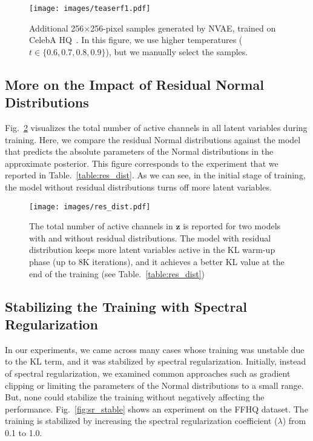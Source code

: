 \documentclass{article}
\newcommand{\z}{{\pmb{z}}}
\begin{document}
\begin{figure}
\centering
\hspace{-0.9cm}
\texttt{[image: images/teaserf1.pdf]}
\caption{Additional 256$\times$256-pixel samples generated by NVAE, trained on CelebA HQ~\cite{karras2018progressive}. In this figure, we use higher temperatures ($t \in \{0.6, 0.7, 0.8, 0.9\}$), but we manually select the samples.}
\label{fig:more_res2}
\vspace{-0.3cm}
\end{figure} 
\subsection{More on the Impact of Residual Normal Distributions}\label{app:res_dist}
Fig.~\ref{fig:res_dist} visualizes the total number of active channels in all latent variables during training. Here, we compare the residual Normal distributions against the model that predicts the absolute parameters of the Normal distributions in the approximate posterior. This figure corresponds to the experiment that we reported in Table.~\ref{table:res_dist}. As we can see, in the initial stage of training, the model without residual distributions turns off more latent variables. 

\begin{figure}
\centering
\texttt{[image: images/res\_dist.pdf]}
\caption{The total number of active channels in $\z$ is reported for two models with and without residual distributions. The model with residual distribution keeps more latent variables active in the KL warm-up phase (up to 8K iterations), and it achieves a better KL value at the end of the training (see Table.~\ref{table:res_dist})}
\label{fig:res_dist}
\end{figure} 
\subsection{Stabilizing the Training with Spectral Regularization}\label{app:sr_stable}
In our experiments, we came across many cases whose training was unstable due to the KL term, and it was stabilized by spectral regularization. Initially, instead of spectral regularization, we examined common approaches such as gradient clipping or limiting the parameters of the Normal distributions to a small range. But, none could stabilize the training without negatively affecting the performance. Fig.~\ref{fig:sr_stable} shows an experiment on the FFHQ dataset. The training is stabilized by increasing the spectral regularization coefficient ($\lambda$) from 0.1 to 1.0.
\end{document}
